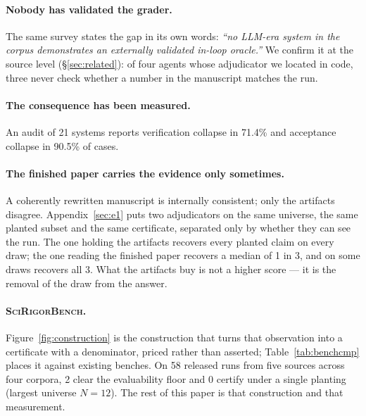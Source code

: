 \documentclass[10pt]{article}
\newcommand{\RM}[1]{{#1}}
\begin{document}
\paragraph{Nobody has validated the grader.} The same survey states the gap in
its own words: \emph{``no LLM-era system in the corpus demonstrates an
externally validated in-loop oracle.''} We confirm it at the source level
(\S\ref{sec:related}): of four agents whose adjudicator we located in code,
three never check whether a number in the manuscript matches the run.

\paragraph{The consequence has been measured.}
An audit of 21 systems \cite{collapse} reports verification collapse in
71.4\% and acceptance collapse in 90.5\% of cases.

\paragraph{The finished paper carries the evidence only sometimes.} A coherently
rewritten manuscript is internally consistent; only the artifacts disagree.
Appendix~\ref{sec:e1} puts two adjudicators on the same universe, the same planted
subset and the same certificate, separated only by whether they can see the run.
The one holding the artifacts recovers every planted claim on every draw; the one
reading the finished paper recovers a median of \RM{1} in \RM{3}, and on some
draws recovers all \RM{3}. What the artifacts buy is not a higher score --- it is
the removal of the draw from the answer.

\paragraph{\textsc{SciRigorBench}.} Figure~\ref{fig:construction} is the
construction that turns that observation into a certificate with a denominator,
priced rather than asserted; Table~\ref{tab:benchcmp} places it against existing
benches. On \RM{58} released runs from \RM{five} sources across \RM{four}
corpora, \RM{2} clear the evaluability floor and \RM{0} certify under a single
planting (largest universe $N=\RM{12}$). The rest of this paper is that
construction and that measurement.
\end{document}
